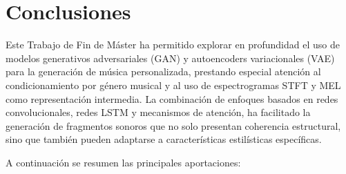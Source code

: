 \chapter{Conclusiones}

Este Trabajo de Fin de Máster ha permitido explorar en profundidad el uso de modelos generativos adversariales (GAN) y autoencoders variacionales (VAE) para la generación de música personalizada, prestando especial atención al condicionamiento por género musical y al uso de espectrogramas STFT y MEL como representación intermedia. La combinación de enfoques basados en redes convolucionales, redes LSTM y mecanismos de atención, ha facilitado la generación de fragmentos sonoros que no solo presentan coherencia estructural, sino que también pueden adaptarse a características estilísticas específicas.

A continuación se resumen las principales aportaciones:


